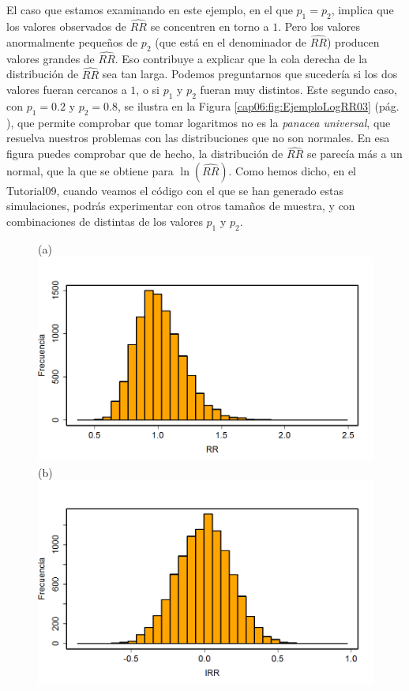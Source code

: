 \begin{ejemplo}
El caso que estamos examinando en este ejemplo, en el que $p_1=p_2$, implica que los valores observados de $\widehat{RR}$ se concentren en torno a $1$. Pero los valores anormalmente pequeños de $p_2$ (que está en el denominador de $\widehat{RR}$) producen valores grandes de $\widehat{RR}$. Eso contribuye a explicar que la cola derecha de la distribución de $\widehat{RR}$ sea tan larga.  Podemos preguntarnos que sucedería si los dos valores fueran cercanos a $1$, o si $p_1$ y $p_2$ fueran muy distintos. Este segundo caso, con $p_1=0.2$ y $p_2=0.8$, se ilustra en la Figura \ref{cap06:fig:EjemploLogRR03} (pág. \pageref{cap06:fig:EjemploLogRR03}), que permite comprobar que tomar logaritmos no es la {\em panacea universal}, que resuelva nuestros problemas con las distribuciones que no son normales. En esa figura puedes comprobar que de hecho, la distribución de $\widehat{RR}$ se parecía más a un normal, que la que se obtiene para $\ln(\widehat{RR})$.  Como hemos dicho, en el Tutorial09, cuando veamos el código con el que se han generado estas simulaciones, podrás experimentar con otros tamaños de muestra, y con combinaciones de distintas de los valores $p_1$ y $p_2$.
\begin{figure}[p]
\begin{center}
\begin{enColor}
(a)\\[3mm]
\includegraphics[width=13cm]{../fig/Cap09-EjemploLogRR03.png}\\[3mm]
(b)\\[3mm]
\includegraphics[width=13cm]{../fig/Cap09-EjemploLogRR04.png}

\end{enColor}
\end{center}
\end{figure}
\end{ejemplo}
